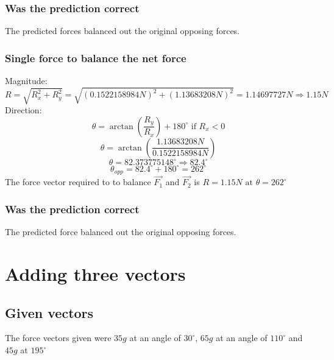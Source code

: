 \documentclass[11pt, letterpaper, includehead]{article}
\begin{document}
\subsubsection{Was the prediction correct} %
The predicted forces balanced out the original opposing forces. 

\subsubsection{Single force to balance the net force} %
Magnitude:
$$R = \sqrt{R_x^2 + R_y^2} = \sqrt{(0.1522158984N)^2 + (1.13683208N)^2} = 1.14697727N \Rightarrow \boxed{1.15N}$$
Direction:
$$\theta = \arctan \left( \frac{R_y}{R_x} \right) + 180^{\circ} \text{ if } R_x < 0$$
$$\theta = \arctan \left( \frac{1.13683208N}{0.1522158984N} \right)$$
$$\theta = 82.373775148^{\circ} \Rightarrow {82.4^{\circ}}$$
$$\theta_{opp} = 82.4^{\circ} + 180^{\circ} = \boxed{262^{\circ}}$$
The force vector required to to balance $\vec{F_1}$ and $\vec{F_2}$ is
$R = 1.15N \text{ at } \theta = 262^{\circ}$

\subsubsection{Was the prediction correct} %
The predicted force balanced out the original opposing forces. 

\section{Adding three vectors} %

\subsection{Given vectors} %
The force vectors given were $35g$ at an angle of $30^{\circ}$, $65g$ at an angle of $110^{\circ}$ and 
$45g$ at $195^{\circ}$
\pagebreak
\end{document}
